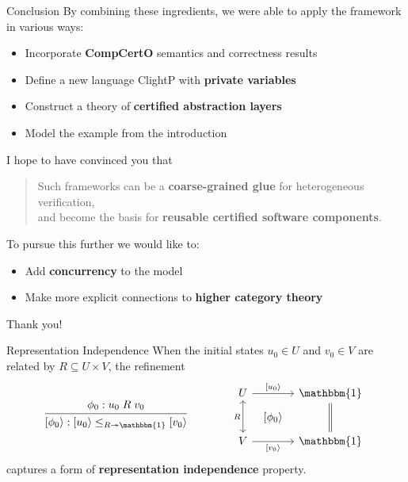 \documentclass[aspectratio=1610,mathserif]{beamer}
\begin{document}
\begin{frame}{Conclusion} %
  By combining these ingredients,
  we were able to apply the framework in various ways:
  \begin{itemize}
    \pause
    \item Incorporate \textbf{CompCertO} semantics and correctness results
    \pause
    \item Define a new language ClightP with \textbf{private variables}
    \pause
    \item Construct a theory of \textbf{certified abstraction layers}
    \pause
    \item Model the example from the introduction
  \end{itemize}

  \pause
  I hope to have convinced you that
  \begin{quote}
    Such frameworks can be a
    \textbf{coarse-grained glue} for heterogeneous verification, \\
    and become the basis for
    \textbf{reusable certified software components}.
  \end{quote}

  \pause
  To pursue this further we would like to:
  \begin{itemize}
    \item Add \textbf{concurrency} to the model
    \pause
    \item Make more explicit connections to \textbf{higher category theory}
  \end{itemize}
\end{frame}

\begin{frame} %
  \Large \centering Thank you!
\end{frame}

\appendix

\begin{frame}[fragile]{Representation Independence} %
  When the initial states $u_0 \in U$ and $v_0 \in V$
  are related by $R \subseteq U \times V$,
  the refinement
  \[
    \begin{prooftree}
      \hypo{\phi_0 : u_0 \mathrel{R} v_0}
      \infer1{[\phi_0\rangle :
         [u_0\rangle \le_{R \twoheadrightarrow \mathbbm{1}}
         [v_0\rangle}
    \end{prooftree}
    \qquad \qquad
    \begin{tikzcd}[sep=tiny]
      U \ar[dd, "R"', leftrightarrow] \ar[rr, "{[u_0\rangle}"] &&
      \mathbbm{1} \ar[dd, equal] \\
      & {[ \phi_0 \rangle} & \\
      V \ar[rr, "{[v_0\rangle}"'] & & \mathbbm{1}
    \end{tikzcd}
  \]
  captures a form of \textbf{representation independence} property.

  \vfill \pause
  \begin{example}
  \end{example}
\end{frame}
\end{document}

